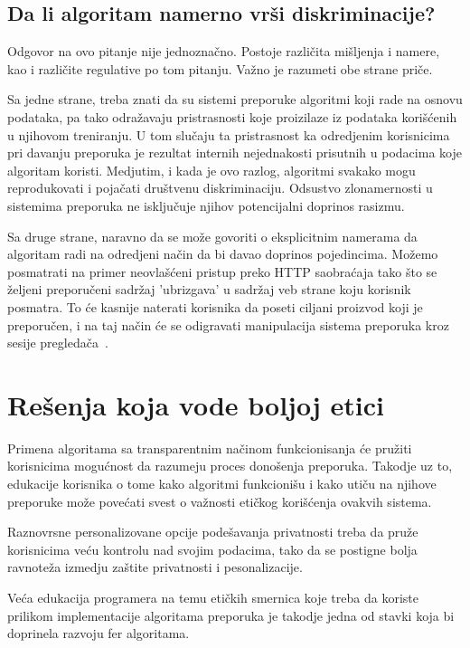 \documentclass[a4paper]{article}
\begin{document}
\subsection{Da li algoritam namerno vrši diskriminacije?}
Odgovor na ovo pitanje nije jednoznačno. Postoje različita mišljenja i namere, kao i različite regulative po tom pitanju. 
Važno je razumeti obe strane priče.

Sa jedne strane, treba znati da su sistemi preporuke algoritmi koji rade na osnovu podataka, pa tako odražavaju pristrasnosti koje proizilaze iz podataka korišćenih u njihovom treniranju. U tom slučaju ta pristrasnost ka odredjenim korisnicima pri davanju preporuka je rezultat internih nejednakosti prisutnih u podacima koje algoritam koristi. Medjutim, i kada je ovo razlog, algoritmi svakako mogu reprodukovati i pojačati društvenu diskriminaciju. Odsustvo zlonamernosti u sistemima preporuka ne isključuje njihov potencijalni doprinos rasizmu.

Sa druge strane, naravno da se može govoriti o eksplicitnim namerama da algoritam radi na odredjeni način da bi davao doprinos pojedincima.
Možemo posmatrati na primer neovlašćeni pristup preko HTTP saobraćaja tako što se željeni preporučeni sadržaj 'ubrizgava' u sadržaj veb strane koju korisnik posmatra. To će kasnije naterati korisnika da poseti ciljani proizvod koji je preporučen, i na taj način će se odigravati manipulacija sistema preporuka kroz sesije pregledača~\cite{treca}.


\section{Rešenja koja vode boljoj etici}
	        
Primena algoritama sa transparentnim načinom funkcionisanja će pružiti korisnicima mogućnost da razumeju proces donošenja preporuka.
Takodje uz to,  edukacije korisnika o tome kako algoritmi funkcionišu i kako utiču na njihove preporuke može povećati svest o važnosti etičkog korišćenja ovakvih sistema.

Raznovrsne personalizovane opcije podešavanja privatnosti treba da pruže korisnicima veću kontrolu nad svojim podacima, tako da se postigne bolja ravnoteža izmedju zaštite privatnosti i pesonalizacije.

Veća edukacija programera na temu etičkih smernica koje treba da koriste prilikom implementacije algoritama preporuka je takodje jedna od stavki koja bi doprinela razvoju fer algoritama.
\end{document}
